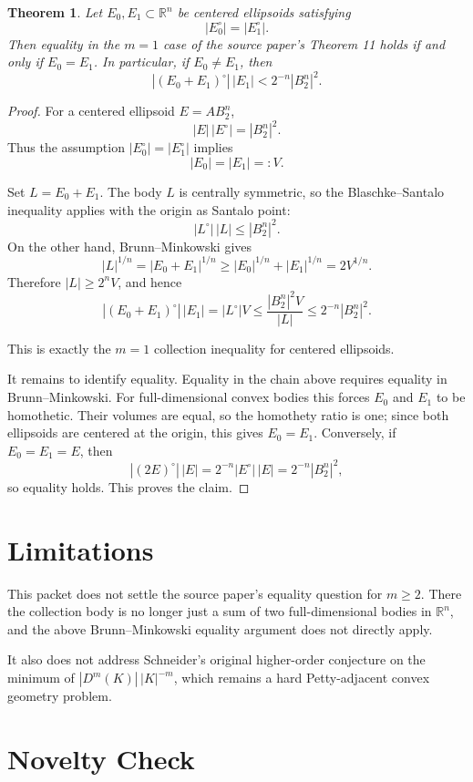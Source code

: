 \documentclass[11pt]{amsart}
\newtheorem{theorem}{Theorem}
\newcommand{\R}{\mathbb R}
\newcommand{\B}{B_2^n}
\begin{document}
\begin{theorem}
Let \(E_0,E_1\subset\R^n\) be centered ellipsoids satisfying
\[
  |E_0^\circ|=|E_1^\circ|.
\]
Then equality in the \(m=1\) case of the source paper's Theorem 11 holds if and
only if \(E_0=E_1\).  In particular, if \(E_0\neq E_1\), then
\[
  |(E_0+E_1)^\circ|\,|E_1|
  < 2^{-n}|\B|^2.
\]
\end{theorem}

\begin{proof}
For a centered ellipsoid \(E=A\B\),
\[
  |E|\,|E^\circ|=|\B|^2.
\]
Thus the assumption \(|E_0^\circ|=|E_1^\circ|\) implies
\[
  |E_0|=|E_1|=:V.
\]

Set \(L=E_0+E_1\).  The body \(L\) is centrally symmetric, so the
Blaschke--Santalo inequality applies with the origin as Santalo point:
\[
  |L^\circ|\,|L|\leq |\B|^2.
\]
On the other hand, Brunn--Minkowski gives
\[
  |L|^{1/n}=|E_0+E_1|^{1/n}
  \geq |E_0|^{1/n}+|E_1|^{1/n}=2V^{1/n}.
\]
Therefore \(|L|\geq 2^nV\), and hence
\[
  |(E_0+E_1)^\circ|\,|E_1|
  =|L^\circ|V
  \leq \frac{|\B|^2V}{|L|}
  \leq 2^{-n}|\B|^2.
\]

This is exactly the \(m=1\) collection inequality for centered ellipsoids.

It remains to identify equality.  Equality in the chain above requires equality
in Brunn--Minkowski.  For full-dimensional convex bodies this forces \(E_0\) and
\(E_1\) to be homothetic.  Their volumes are equal, so the homothety ratio is
one; since both ellipsoids are centered at the origin, this gives \(E_0=E_1\).
Conversely, if \(E_0=E_1=E\), then
\[
  |(2E)^\circ|\,|E|
  =2^{-n}|E^\circ|\,|E|
  =2^{-n}|\B|^2,
\]
so equality holds.  This proves the claim.
\end{proof}

\section*{Limitations}

This packet does not settle the source paper's equality question for \(m\geq2\).
There the collection body is no longer just a sum of two full-dimensional
bodies in \(\R^n\), and the above Brunn--Minkowski equality argument does not
directly apply.

It also does not address Schneider's original higher-order conjecture on the
minimum of \(|D^m(K)|\,|K|^{-m}\), which remains a hard Petty-adjacent convex
geometry problem.

\section*{Novelty Check}
\end{document}
